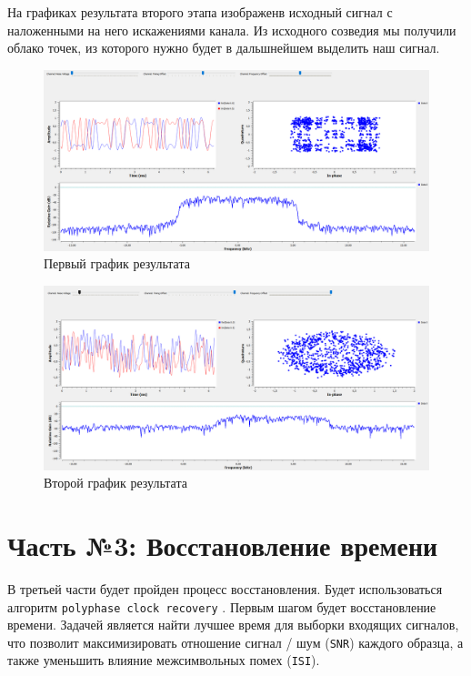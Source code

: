 \documentclass[a4paper]{article}
\begin{document}
           На графиках результата второго этапа изображенв исходный сигнал с наложенными на него искажениями канала. Из исходного созведия мы получили облако точек, из которого нужно будет в дальшнейшем выделить наш сигнал.
           
           \begin{figure}[H]
                \centering
                \includegraphics[width=\textwidth]{ex_2_2.png}
                \caption{Первый график результата}
                \label{fig:ex_2_2}
            \end{figure}
           
           \begin{figure}[H]
                \centering
                \includegraphics[width=\textwidth]{ex_2_3.png}
                \caption{Второй график результата}
                \label{fig:ex_2_3}
            \end{figure}
           
    \newpage
        \section{Часть №3: Восстановление времени}
           В третьей части будет пройден процесс восстановления. Будет использоваться алгоритм \texttt{polyphase clock recovery} . Первым шагом будет восстановление времени. Задачей является найти лучшее время для выборки входящих сигналов, что позволит максимизировать отношение сигнал / шум (\texttt{SNR}) каждого образца, а также уменьшить влияние межсимвольных помех (\texttt{ISI}).
           
\end{document}
